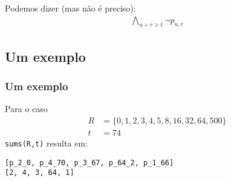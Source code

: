 \documentclass[a4paper,12pt]{beamer}
\theoremstyle{definition}
\theoremstyle{theorem}
\theoremstyle{remark}
\begin{document}
\begin{frame}
Podemos dizer (mas não é preciso):
\begin{align}
   \bigwedge_{u+r>t} \lnot p_{u,r}
\end{align}
\end{frame}

\subsection{Um exemplo}
\begin{frame}[fragile] %
\frametitle{Um exemplo}
Para o caso
\begin{align*}
   R&=\{0,1,2,3,4,5,8,16,32,64,500\}\\
   t&=74
\end{align*}
\texttt{sums(R,t)} resulta
em:
\begin{verbatim}
[p_2_0, p_4_70, p_3_67, p_64_2, p_1_66]
[2, 4, 3, 64, 1]
\end{verbatim}
\end{frame}
\end{document}
